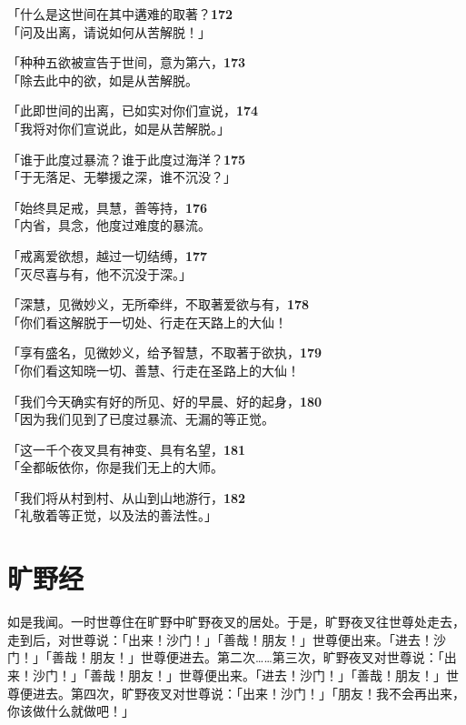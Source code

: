 「什么是这世间在其中遘难的取著？\hfill{\grayfootnotesize \textbf{172}} \\
「问及出离，请说如何从苦解脱！」


「种种五欲被宣告于世间，意为第六，\hfill{\grayfootnotesize \textbf{173}} \\
「除去此中的欲，如是从苦解脱。


「此即世间的出离，已如实对你们宣说，\hfill{\grayfootnotesize \textbf{174}} \\
「我将对你们宣说此，如是从苦解脱。」


「谁于此度过暴流？谁于此度过海洋？\hfill{\grayfootnotesize \textbf{175}} \\
「于无落足、无攀援之深，谁不沉没？」


「始终具足戒，具慧，善等持，\hfill{\grayfootnotesize \textbf{176}} \\
「内省，具念，他度过难度的暴流。


「戒离爱欲想，越过一切结缚，\hfill{\grayfootnotesize \textbf{177}} \\
「灭尽喜与有，他不沉没于深。」


「深慧，见微妙义，无所牵绊，不取著爱欲与有，\hfill{\grayfootnotesize \textbf{178}} \\
「你们看这解脱于一切处、行走在天路上的大仙！


「享有盛名，见微妙义，给予智慧，不取著于欲执，\hfill{\grayfootnotesize \textbf{179}} \\
「你们看这知晓一切、善慧、行走在圣路上的大仙！


「我们今天确实有好的所见、好的早晨、好的起身，\hfill{\grayfootnotesize \textbf{180}} \\
「因为我们见到了已度过暴流、无漏的等正觉。


「这一千个夜叉具有神变、具有名望，\hfill{\grayfootnotesize \textbf{181}} \\
「全都皈依你，你是我们无上的大师。


「我们将从村到村、从山到山地游行，\hfill{\grayfootnotesize \textbf{182}} \\
「礼敬着等正觉，以及法的善法性。」


\section{旷野经}

如是我闻。一时世尊住在旷野中旷野夜叉的居处。于是，旷野夜叉往世尊处走去，走到后，对世尊说：「出来！沙门！」「善哉！朋友！」世尊便出来。「进去！沙门！」「善哉！朋友！」世尊便进去。第二次……第三次，旷野夜叉对世尊说：「出来！沙门！」「善哉！朋友！」世尊便出来。「进去！沙门！」「善哉！朋友！」世尊便进去。第四次，旷野夜叉对世尊说：「出来！沙门！」「朋友！我不会再出来，你该做什么就做吧！」


